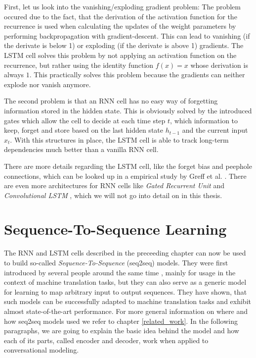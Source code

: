 First, let us look into the vanishing/exploding gradient problem: The problem occured due to the fact, that the derivation of the activation function for the recurrence is used when calculating the updates of the weight parameters by performing backpropagation with gradient-descent. This can lead to vanishing (if the derivate is below 1) or exploding (if the derivate is above 1) gradients. The LSTM cell solves this problem by not applying an activation function on the recurrence, but rather using the identity function $f(x) = x$ whose derivation is always $1$. This practically solves this problem because the gradients can neither explode nor vanish anymore.

The second problem is that an RNN cell has no easy way of forgetting information stored in the hidden state. This is obviously solved by the introduced gates which allow the cell to decide at each time step $t$, which information to keep, forget and store based on the last hidden state $h_{t-1}$ and the current input $x_t$. With this structures in place, the LSTM cell is able to track long-term dependencies much better than a vanilla RNN cell.

There are more details regarding the LSTM cell, like the forget bias and peephole connections, which can be looked up in a empirical study by Greff et al. \cite{Greff:2016}. There are even more architectures for RNN cells like \emph{Gated Recurrent Unit} \cite{Chung:2014} and \emph{Convolutional LSTM} \cite{Xingjian:2015}, which we will not go into detail on in this thesis.

\section{Sequence-To-Sequence Learning}
\label{fundamentals:seq2seq}
The RNN and LSTM cells described in the preceeding chapter can now be used to build so-called \emph{Sequence-To-Sequence} (seq2seq) models. They were first introduced by several people around the same time \cite{Sutskever:2014}\cite{Kalchbrenner:2013}\cite{Cho:2014}, mainly for usage in the context of machine translation tasks, but they can also serve as a generic model for learning to map arbitrary input to output sequences. They have shown, that such models can be successfully adapted to machine translation tasks and exhibit almost state-of-the-art performance. For more general information on where and how seq2seq models used we refer to chapter \ref{related_work}. In the following paragraphs, we are going to explain the basic idea behind the model and how each of its parts, called encoder and decoder, work when applied to conversational modeling.

